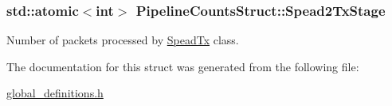 \subsubsection[{\texorpdfstring{Spead2\+Tx\+Stage}{Spead2TxStage}}]{\setlength{\rightskip}{0pt plus 5cm}std\+::atomic$<$int$>$ Pipeline\+Counts\+Struct\+::\+Spead2\+Tx\+Stage}\hypertarget{struct_pipeline_counts_struct_abaa985e5f295aaa25939f872be316ef9}{}\label{struct_pipeline_counts_struct_abaa985e5f295aaa25939f872be316ef9}
Number of packets processed by \hyperlink{class_spead_tx}{Spead\+Tx} class. 

The documentation for this struct was generated from the following file\+:\begin{DoxyCompactItemize}
\item 
\hyperlink{global__definitions_8h}{global\+\_\+definitions.\+h}\end{DoxyCompactItemize}
